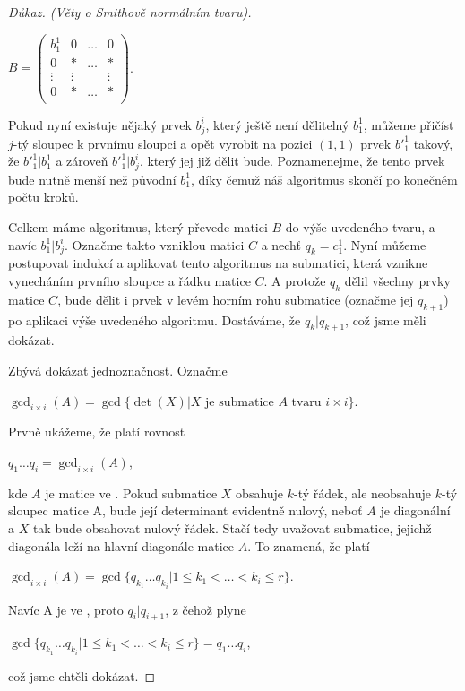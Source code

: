 \begin{proof}[Důkaz. (Věty o Smithově normálním tvaru)]
\begin{center}
$ B =
    \begin{pmatrix}
        b_1^1   & 0      & \hdots & 0       \\
        0       & \ast   & \hdots & \ast    \\
        \vdots  & \vdots &        & \vdots   \\
        0       & \ast   & \hdots & \ast    \\
    \end{pmatrix}
$.
\end{center}


Pokud nyní existuje nějaký prvek $ b_j^i $, který ještě není dělitelný $ b_1^1 $, můžeme
přičíst $j$-tý sloupec k prvnímu sloupci a opět vyrobit na pozici $ (1, 1) $ prvek $ {b'}_{1}^{1} $
takový, že $ {b'}_{1}^{1} \vert b_1^1 $ a zároveň $ {b'}_{1}^{1} \vert b_j^i $,
který jej již dělit bude. Poznamenejme, že tento prvek bude nutně menší než původní
$ b_1^1 $, díky čemuž náš algoritmus skončí po konečném počtu kroků.

Celkem máme algoritmus, který převede matici $B$ do výše uvedeného tvaru,
a navíc $ {b}_{1}^{1} \vert b_j^i $.
Označme takto vzniklou matici $ C $ a nechť $ q_k = c_1^1 $.
Nyní můžeme postupovat indukcí a aplikovat tento algoritmus
na submatici, která vznikne vynecháním prvního sloupce a řádku matice $C$.
A protože $ q_k $ dělil všechny prvky matice $C$, bude dělit i prvek v levém
horním rohu submatice (označme jej $ q_{k+1} $) po aplikaci výše uvedeného algoritmu.
Dostáváme, že $ q_k \vert q_{k+1}$, což jsme měli dokázat.

Zbývá dokázat jednoznačnost. Označme
\begin{center}
$ \gcd_{i \times i }(A) = \gcd\{\det(X) \vert X \textrm{ je submatice } A \textrm{ tvaru }i \times i\} $.
\end{center}

Prvně ukážeme, že platí rovnost
\begin{center}
$ q_1 \hdots q_i = \gcd_{i \times i }(A)$,
\end{center}

kde $ A $ je matice ve \snf{}. Pokud submatice $ X $ obsahuje $k$-tý řádek, ale
neobsahuje $k$-tý sloupec matice A, bude její determinant evidentně nulový,
neboť $ A $ je diagonální a $ X $ tak bude obsahovat nulový řádek. Stačí tedy
uvažovat submatice, jejichž diagonála leží na hlavní diagonále matice $ A $. To
znamená, že platí
\begin{center}
$ \gcd_{i \times i }(A) = \gcd\{q_{k_1} \hdots q_{k_i} \vert 1 \leq k_1 < \hdots < k_i \leq r \} $.
\end{center}
Navíc A je ve \snf{}, proto $ q_i | q_{i+1} $, z čehož plyne
\begin{center}
$ \gcd\{q_{k_1} \hdots q_{k_i} \vert 1 \leq k_1 < \hdots < k_i \leq r \} = q_1 \hdots q_i $,
\end{center}
což jsme chtěli dokázat.


\end{proof}
